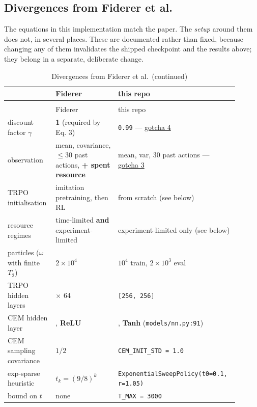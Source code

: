 \documentclass[12pt,a4paper]{article}
\begin{document}
\FloatBarrier
\subsection{Divergences from Fiderer et al.}\label{sec:divergences-from-fiderer-et-al}
The equations in this implementation match the paper. The \emph{setup} around them does not, in several places. These are documented rather than fixed, because changing any of them invalidates the shipped checkpoint and the results above; they belong in a separate, deliberate change.

\begin{center}
\footnotesize
\begin{longtable}{>{\raggedright\arraybackslash}p{0.207\linewidth}>{\raggedright\arraybackslash}p{0.268\linewidth}>{\raggedright\arraybackslash}p{0.430\linewidth}}
\caption{Divergences from Fiderer et al.}\label{tab:divergences-from-fiderer-et-al}\\
\toprule
 & Fiderer & this repo \\
\midrule
\endfirsthead
\caption[]{Divergences from Fiderer et al.\ (continued)}\\
\toprule
 & Fiderer & this repo \\
\midrule
\endhead
\bottomrule
\endfoot
discount factor $\gamma$ & \textbf{1} (required by Eq. 3) & \texttt{0.\allowbreak{}99} --- \hyperref[sec:4-gamma--099-breaks-the-bayes-risk-identity]{gotcha 4} \\
observation & mean, covariance, $\leq$30 past actions, \textbf{+ spent resource} & mean, var, 30 past actions --- \hyperref[sec:3-the-observation-is-missing-the-resource-counter-and-is-badly-scaled]{gotcha 3} \\
TRPO initialisation & imitation pretraining, then RL & from scratch (see below) \\
resource regimes & time-limited \textbf{and} experiment-limited & experiment-limited only (see below) \\
particles ($\omega$ with finite $T_2$) & $2\times10^4$ & $10^4$ train, $2\times10^3$ eval \\
TRPO hidden layers & 2 $\times$ 64 & \texttt{[256, 256]} \\
CEM hidden layer & 16, \textbf{ReLU} & 16, \textbf{Tanh} (\texttt{models/\allowbreak{}nn.\allowbreak{}py:\allowbreak{}91}) \\
CEM sampling covariance & $1/2$ & \texttt{CEM\_\allowbreak{}INIT\_\allowbreak{}STD = 1.\allowbreak{}0} \\
exp-sparse heuristic & $t_k = (9/8)^k$ & \texttt{ExponentialSweepPolicy(t0=0.\allowbreak{}1, r=1.\allowbreak{}05)} \\
bound on $t$ & none & \texttt{T\_\allowbreak{}MAX = 3000} \\
\end{longtable}
\end{center}
\end{document}
